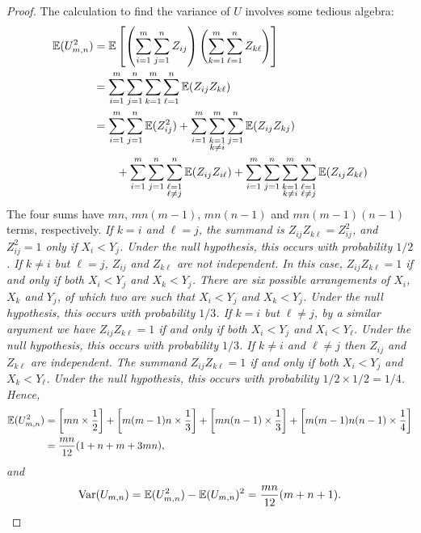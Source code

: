 \begin{proof}
The calculation to find the variance of $U$ involves some tedious algebra:
\begin{align*}
\mathbb{E}(U_{m,n}^2)
	& = \mathbb{E}\left[\left(\sum_{i=1}^m\sum_{j=1}^n Z_{ij}\right)\left(\sum_{k=1}^m\sum_{\ell=1}^n Z_{k\ell}\right)\right] \\
	& = \sum_{i=1}^m\sum_{j=1}^n\sum_{k=1}^m\sum_{\ell=1}^n \mathbb{E}(Z_{ij}Z_{k\ell}) \\
	& = \sum_{i=1}^m\sum_{j=1}^n\mathbb{E}(Z_{ij}^2) 
			+ \sum_{i=1}^m\sum_{\substack{k=1\\k\neq i}}^m\sum_{j=1}^n\mathbb{E}(Z_{ij}Z_{kj}) \\
	& \qquad + \sum_{i=1}^m\sum_{j=1}^n\sum_{\substack{\ell=1\\\ell\neq j}}^n\mathbb{E}(Z_{ij}Z_{i\ell})
			+ \sum_{i=1}^m\sum_{j=1}^n\sum_{\substack{k=1\\k\neq i}}^m\sum_{\substack{\ell=1\\\ell\neq j}}^n\mathbb{E}(Z_{ij}Z_{k\ell}) \\
\end{align*}
The four sums have $mn$, $mn(m-1)$, $mn(n-1)$ and $mn(m-1)(n-1)$ terms, respectively.
\ben
\it 
If $k=i$ and $\ell=j$, the summand is $Z_{ij}Z_{k\ell}=Z_{ij}^2$, and $Z^2_{ij}=1$ only if $X_i<Y_j$. Under the null hypothesis, this occurs with probability $1/2$.
\it
If $k\neq i$ but $\ell=j$, $Z_{ij}$ and $Z_{k\ell}$ are not independent. In this case, $Z_{ij}Z_{k\ell}=1$ if and only if both $X_i<Y_j$ and $X_k<Y_j$. There are six possible arrangements of $X_i$, $X_k$ and $Y_j$, of which two are such that $X_i<Y_j$ and $X_k<Y_j$. Under the null hypothesis, this occurs with probability $1/3$.
\it
If $k=i$ but $\ell\neq j$, by a similar argument we have $Z_{ij}Z_{k\ell}=1$ if and only if both $X_i<Y_j$ and $X_i<Y_{\ell}$. Under the null hypothesis, this occurs with probability $1/3$.
\it
If $k\neq i$ and $\ell\neq j$ then $Z_{ij}$ and $Z_{k\ell}$ are independent. The summand $Z_{ij}Z_{k\ell}=1$ if and only if both $X_i<Y_j$ and $X_k<Y_{\ell}$. Under the null hypothesis, this occurs with probability $1/2\times 1/2 = 1/4$.
\een
Hence, 
\begin{align*}
\mathbb{E}(U_{m,n}^2)
	& = \left[mn\times\frac{1}{2}\right] + \left[m(m-1)n\times\frac{1}{3}\right] 
			+ \left[mn(n-1)\times\frac{1}{3}\right] + \left[m(m-1)n(n-1)\times\frac{1}{4}\right] \\
	& = \frac{mn}{12}(1 + n + m + 3mn),
\end{align*}
and
\[
\text{Var}(U_{m,n}) = \mathbb{E}(U_{m,n}^2) - \mathbb{E}(U_{m,n})^2 = \frac{mn}{12}(m+n+1).
\]
\end{proof}

